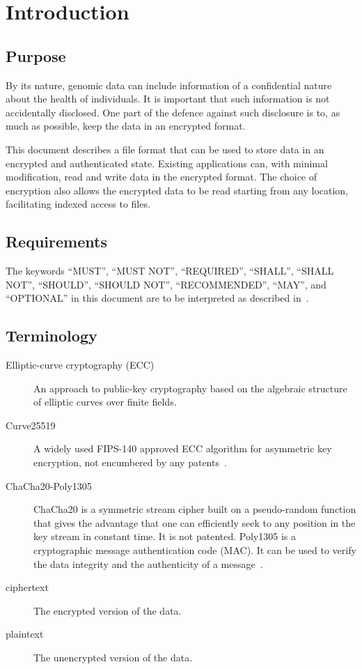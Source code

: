 \section{Introduction}
\subsection{Purpose}
By its nature, genomic data can include information of a confidential nature about the health of individuals.
%
It is important that such information is not accidentally disclosed.
%
One part of the defence against such disclosure is to, as much as possible, keep the data in an encrypted format.
%

This document describes a file format that can be used to store data in an encrypted and authenticated state.
%
Existing applications can, with minimal modification, read and write data in the encrypted format.
%
The choice of encryption also allows the encrypted data to be read starting from any location, facilitating indexed access to files.

\subsection{Requirements}
The keywords ``MUST'', ``MUST NOT'', ``REQUIRED'', ``SHALL'', ``SHALL
NOT'', ``SHOULD'', ``SHOULD NOT'', ``RECOMMENDED'', ``MAY'', and
``OPTIONAL'' in this document are to be interpreted as described
in~\cite{RFC2119}.

\subsection{Terminology}
%
\begin{description}
\item[Elliptic-curve cryptography (ECC)] %
An approach to public-key cryptography based on the algebraic   structure of elliptic curves over finite fields.
% 
\item[Curve25519] %
A widely used FIPS-140 approved ECC algorithm for asymmetric key encryption, not encumbered by any patents~\cite{RFC7748}.
% 
\item[ChaCha20-Poly1305] %
ChaCha20 is a symmetric stream cipher built on a pseudo-random function that gives the advantage that one can efficiently seek to any position in the key stream in constant time.
% 
It is not patented.
% 
Poly1305 is a cryptographic message authentication code (MAC).
% 
It can be used to verify the data integrity and the authenticity of a message~\cite{RFC8439}.
% 
\item[ciphertext] %
The encrypted version of the data.
% 
\item[plaintext] %
The unencrypted version of the data.
%
\end{description}
